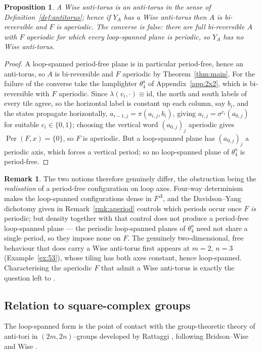 \documentclass[11pt,reqno]{amsart}
\theoremstyle{plain}
\newtheorem{proposition}[theorem]{Proposition}
\theoremstyle{definition}
\newtheorem{remark}[theorem]{Remark}
\newcommand{\Per}{\operatorname{Per}}
\begin{document}
\begin{proposition}\label{prop:loops}
A Wise anti-torus is an anti-torus in the sense of Definition~\ref{def:antitorus};
hence if $Y_A$ has a Wise anti-torus then $A$ is bi-reversible and $F$ is aperiodic.
The converse is \emph{false}: there are full bi-reversible $A$ with $F$ aperiodic for
which every loop-spanned plane is periodic, so $Y_A$ has no Wise anti-torus.
\end{proposition}

\begin{proof}
A loop-spanned period-free plane is in particular period-free, hence an anti-torus,
so $A$ is bi-reversible and $F$ aperiodic by Theorem~\ref{thm:main}. For the failure
of the converse take the lamplighter $\theta_4^a$ of Appendix~\ref{app:2x2}, which is
bi-reversible with $F$ aperiodic. Since $\lambda(v_i,\cdot)\equiv\mathrm{id}$, the
north and south labels of every tile agree, so the horizontal label is constant up
each column, say $b_i$, and the states propagate horizontally,
$a_{i-1,j}=\pi(a_{i,j},b_i)$, giving $a_{i,j}=\sigma^{c_i}(a_{0,j})$ for suitable
$c_i\in\{0,1\}$; choosing the vertical word $(a_{0,j})_j$ aperiodic gives
$\Per(F,x)=\{0\}$, so $F$ is aperiodic. But a loop-spanned plane has $(a_{0,j})_j$ a
periodic axis, which forces a vertical period; so no loop-spanned plane of
$\theta_4^a$ is period-free.
\end{proof}

\begin{remark}\label{rem:gap}
The two notions therefore genuinely differ, the obstruction being the
\emph{realisation} of a period-free configuration on loop axes. Four-way determinism
makes the loop-spanned configurations dense in $F^\Delta$, and the Davidson--Yang
dichotomy given in Remark~\ref{rmk:aperiod} controls which periods occur once $F$
\emph{is} periodic; but density together with that control does not produce a
period-free loop-spanned plane --- the periodic loop-spanned planes of $\theta_4^a$
need not share a single period, so they impose none on $F$. The genuinely
two-dimensional, free behaviour that does carry a Wise
anti-torus first appears at $m=2$, $n=3$ (Example~\ref{ex:53}), whose tiling has both
axes constant, hence loop-spanned. Characterising the aperiodic $F$ that admit a Wise
anti-torus is exactly the question left to \cite{W,GM}.
\end{remark}

\subsection*{Relation to square-complex groups}
The loop-spanned form is the point of contact with the group-theoretic theory of
anti-tori in $(2m,2n)$--groups developed by Rattaggi \cite{Rat}, following
Bridson--Wise and Wise \cite{W}.
\end{document}
